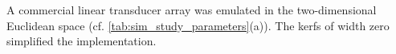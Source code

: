 A commercial linear transducer array was emulated in
the two-dimensional Euclidean space
(cf. \cref{tab:sim_study_parameters}(a)).
The kerfs of
width zero simplified
the implementation.
%
%
%
%
